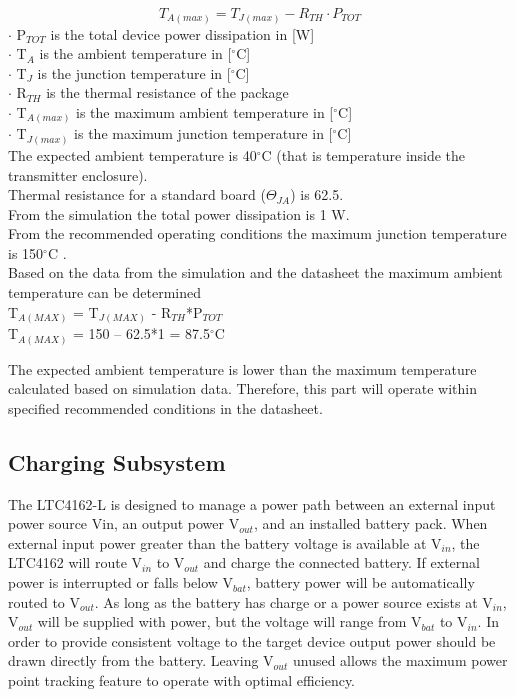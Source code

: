 \documentclass[12pt]{article}
\begin{document}
\begin{equation}
T_{A(max)} = T_{J(max)} - R_{TH} \cdot P_{TOT}
\end{equation}
\noindent
$\cdot $ P$_{TOT}$ is the total device power dissipation in [W]
\\
\noindent
$\cdot $ T$_A$ is the ambient temperature in [$^\circ$C]
\\
\noindent
$\cdot $ T$_J$ is the junction temperature in [$^\circ$C]
\\
\noindent
$\cdot $ R$_{TH}$ is the thermal resistance of the package 
\\
\noindent
$\cdot $ T$_{A(max)}$ is the maximum ambient temperature in [$^\circ$C]
\\
\noindent
$\cdot $ T$_{J(max)}$ is the maximum junction temperature in [$^\circ$C]
\\

\noindent
The expected ambient temperature is 40$^\circ$C (that is temperature inside the transmitter enclosure).\\
Thermal resistance for a standard board ($\Theta_{JA}$) is 62.5 \cite{TPS54160}.\\
From the simulation the total power dissipation is 1 W.\\
From the recommended operating conditions the maximum junction temperature is 150$^\circ$C \cite{TPS54160}.\\
Based on the data from the simulation and the datasheet the maximum ambient temperature can be determined\\
T$_{A(MAX)}$ = T$_{J(MAX)}$ - R$_{TH}$*P$_{TOT}$ \\
T$_{A(MAX)}$ = 150 – 62.5*1 = 87.5$^\circ$C

\hfill
\pagebreak
\hfill

\indent
The expected ambient temperature is lower than the maximum temperature calculated based on simulation data. Therefore, this part will operate within specified recommended conditions in the datasheet.

\subsection{Charging Subsystem}

\indent \indent
The LTC4162-L is designed to manage a power path between an external input power source Vin, an output power V$_{out}$, and an installed battery pack. When external input power greater than the battery voltage is available at V$_{in}$, the LTC4162 will route V$_{in}$ to V$_{out}$ and charge the connected battery. If external power is interrupted or falls below V$_{bat}$, battery power will be automatically routed to V$_{out}$. As long as the battery has charge or a power source exists at V$_{in}$, V$_{out}$ will be supplied with power, but the voltage will range from V$_{bat}$ to V$_{in}$. In order to provide consistent voltage to the target device output power should be drawn directly from the battery. Leaving V$_{out}$ unused allows the maximum power point tracking feature to operate with optimal efficiency.\\
\end{document}
